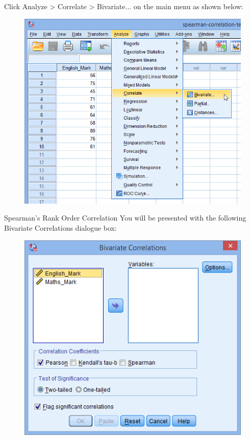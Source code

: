 \documentclass[]{article}
\begin{document}
Click Analyze > Correlate > Bivariate... on the main menu as shown below:
\begin{figure}
\centering
\includegraphics[width=0.7\linewidth]{images/spearmans-rank-order-correlation-1}
\caption{}
\label{fig:spearmans-rank-order-correlation-1}
\end{figure}

Spearman's Rank Order Correlation
You will be presented with the following Bivariate Correlations dialogue box:
\begin{figure}
\centering
\includegraphics[width=0.7\linewidth]{images/spearmans-rank-order-correlation-2}
\caption{}
\label{fig:spearmans-rank-order-correlation-2}
\end{figure}
\end{document}
